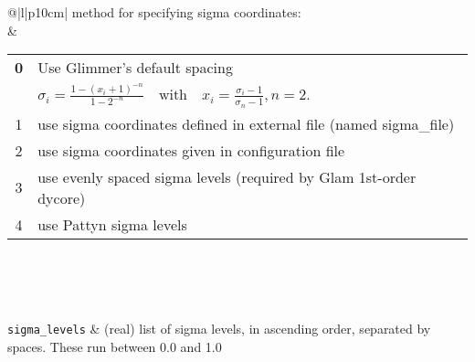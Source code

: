 \begin{center}
\begin{supertabular*}{\textwidth}{@{\extracolsep{\fill}}|l|p{10cm}|}
      method for specifying sigma coordinates:  \\ &
    \begin{tabular}[t]{cl}
      {\bf 0} & Use Glimmer's default spacing \\[0.05in] 
        & $\sigma_i=\frac{1-(x_i+1)^{-n}}{1-2^{-n}}\quad\mbox{with}\quad x_i=\frac{\sigma_i-1}{\sigma_n-1}, n=2.$ \\[0.05in]
      1 & use sigma coordinates defined in external file (named sigma\_file) \\
      2 & use sigma coordinates given in configuration file \\
      3 & use evenly spaced sigma levels (required by Glam 1st-order dycore) \\
      4 & use Pattyn sigma levels \\
    \end{tabular}\\
    \hline
  
    \\
    \hline
     \\
    \hline
    \texttt{sigma\_levels} & (real) list of sigma levels, in ascending order, separated by spaces. These run between 0.0 and 1.0 \\
    \hline



\end{supertabular*}
\end{center}

